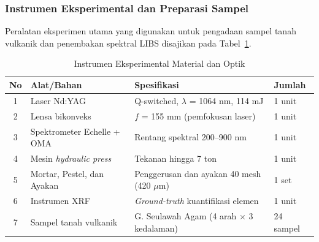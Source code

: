 \documentclass[12pt, a4paper]{article}
\begin{document}
\subsubsection{Instrumen Eksperimental dan Preparasi Sampel}
Peralatan eksperimen utama yang digunakan untuk pengadaan sampel tanah vulkanik dan penembakan spektral LIBS disajikan pada Tabel~\ref{tab:alat-bahan}.

\begin{table}[htbp]
\centering
\caption{Instrumen Eksperimental Material dan Optik}
\label{tab:alat-bahan}
\small
\begin{tabular}{clp{5.5cm}l}
\toprule
\textbf{No} & \textbf{Alat/Bahan} & \textbf{Spesifikasi} & \textbf{Jumlah} \\
\midrule
1  & Laser Nd:YAG              & Q-switched, $\lambda$ = 1064 nm, 114 mJ   & 1 unit \\
2  & Lensa bikonveks           & $f$ = 155 mm (pemfokusan laser)            & 1 unit \\
3  & Spektrometer Echelle + OMA& Rentang spektral 200--900 nm               & 1 unit \\
4  & Mesin \textit{hydraulic press} & Tekanan hingga 7 ton                  & 1 unit \\
5  & Mortar, Pestel, dan Ayakan& Penggerusan dan ayakan 40 mesh (420 $\mu$m) & 1 set  \\
6  & Instrumen XRF             & \textit{Ground-truth} kuantifikasi elemen  & 1 unit \\
7  & Sampel tanah vulkanik     & G. Seulawah Agam (4 arah $\times$ 3 kedalaman) & 24 sampel \\
\bottomrule
\end{tabular}
\end{table}
\end{document}
